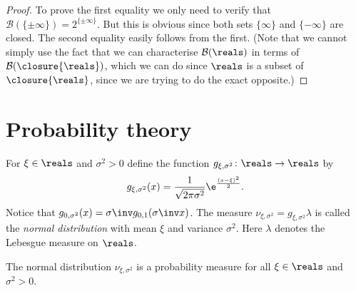 \documentclass[article, a4paper, 11pt, oneside]{memoir}
\numberwithin{equation}{chapter}
\newcommand{\borel}{\mathcal{B}}
\newcommand{\exreals}{\closure{\reals}}
\begin{document}
\begin{proof}
    To prove the first equality we only need to verify that $\borel(\{\pm\infty\}) = 2^{\{\pm\infty\}}$. But this is obvious since both sets $\{\infty\}$ and $\{-\infty\}$ are closed. The second equality easily follows from the first. (Note that we cannot simply use the fact that we can characterise $\borel(\reals)$ in terms of $\borel(\exreals)$, which we can do since $\reals$ is a subset of $\exreals$, since we are trying to do the exact opposite.)
\end{proof}


\chapter{Probability theory}

For $\xi \in \reals$ and $\sigma^2 > 0$ define the function $g_{\xi,\sigma^2} \colon \reals \to \reals$ by
%
\begin{equation*}
    g_{\xi,\sigma^2}(x)
        = \frac{1}{\sqrt{2\pi \sigma^2}} \e^{\frac{(x-\xi)^2}{2}}.
\end{equation*}
%
Notice that $g_{0,\sigma^2}(x) = \sigma\inv g_{0,1}(\sigma\inv x)$. The measure $\nu_{\xi,\sigma^2} = g_{\xi,\sigma^2} \lambda$ is called the \emph{normal distribution} with mean $\xi$ and variance $\sigma^2$. Here $\lambda$ denotes the Lebesgue measure on $\reals$.

\begin{lemma}
    The normal distribution $\nu_{\xi,\sigma^2}$ is a probability measure for all $\xi \in \reals$ and $\sigma^2 > 0$.
\end{lemma}
\end{document}
